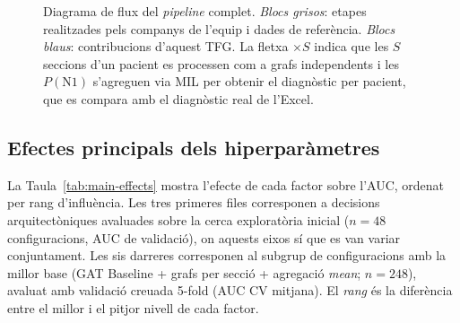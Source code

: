 \documentclass[10pt,a4paper,twocolumn,twoside]{article}
\begin{document}
\begin{figure}[H]
\caption{Diagrama de flux del \textit{pipeline} complet. \textit{Blocs grisos}: etapes
realitzades pels companys de l'equip i dades de referència. \textit{Blocs blaus}:
contribucions d'aquest TFG. La fletxa ${\times}S$ indica que les $S$ seccions d'un
pacient es processen com a grafs independents i les $P(\text{N1})$ s'agreguen via MIL
per obtenir el diagnòstic per pacient, que es compara amb el diagnòstic real de l'Excel.}
\label{fig:pipeline}
\end{figure}

\newpage

\subsection{Efectes principals dels hiperparàmetres}
\label{app:main-effects}

La Taula~\ref{tab:main-effects} mostra l'efecte de cada factor sobre l'AUC, ordenat per rang
d'influència. Les tres primeres files corresponen a decisions arquitectòniques avaluades sobre
la cerca exploratòria inicial ($n = 48$ configuracions, AUC de validació), on aquests eixos
sí que es van variar conjuntament. Les sis darreres corresponen al subgrup de configuracions
amb la millor base (GAT Baseline + grafs per secció + agregació \textit{mean}; $n = 248$),
avaluat amb validació creuada 5-fold (AUC CV mitjana). El \textit{rang} és la diferència entre
el millor i el pitjor nivell de cada factor.
\end{document}
